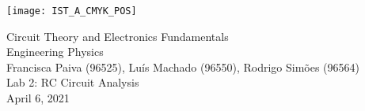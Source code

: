 
\thispagestyle {empty}

\texttt{[image: IST\_A\_CMYK\_POS]}

\begin{center}
%
\vspace{1.0cm}

\vspace{1cm}
{\FontLb Circuit Theory and Electronics Fundamentals} \\ %
\vspace{1cm}
{\FontSn Engineering Physics} \\ %
{\small Francisca Paiva (96525), Luís Machado (96550), Rodrigo Simões (96564)} \\
\vspace{1cm}
{\FontSn Lab 2: RC Circuit Analysis} \\
\vspace{1cm}
{\FontSn April 6, 2021} \\ %
%
\end{center}
